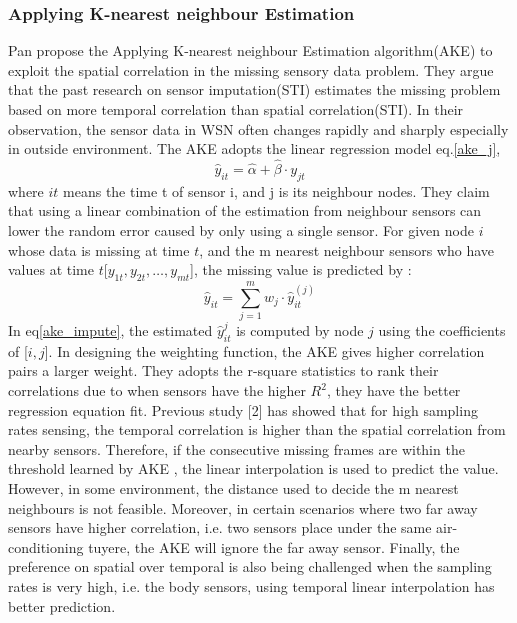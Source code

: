  \subsubsection{Applying K-nearest neighbour Estimation}
Pan\cite{pan2010k} propose the Applying K-nearest neighbour Estimation algorithm(AKE) to exploit the spatial correlation in the missing sensory data problem. They argue that the past research on sensor imputation(STI) estimates the missing problem based on more temporal correlation than spatial correlation(STI). In their observation, the sensor data in WSN often changes rapidly and sharply especially in outside environment. The AKE adopts the linear regression model eq.\ref{ake_j},
\begin{equation}
\hat{y}_{it} =\hat{\alpha} +\hat{\beta}\cdot y_{jt}
\label{ake_j}
\end{equation}
 where $it$ means the time t of sensor i,  and j is its neighbour nodes.  
They claim that using a linear combination of the estimation from neighbour sensors can lower the random error caused by only using a single sensor. 
For given node $i$ whose data is missing at time $t$, and the m nearest neighbour sensors who have values at time $t$[$y_{1t}, y_{2t},\dots, y_{mt}$], the missing value is predicted by :   
 \begin{equation}
 \hat{y}_{it} =\sum_{j=1}^m w_j \cdot \hat{y}_{it}^{(j)}
 \label{ake_impute}
 \end{equation}
%
In eq\ref{ake_impute}, the estimated $\hat{y}_{it}^{j}$ is computed by node $j$ using the coefficients of [$i,j$]. In designing the weighting function, the AKE gives higher correlation pairs a larger weight. They adopts the r-square statistics to rank their correlations due to when sensors have the higher $R^2$, they have the better regression equation fit. 
Previous study [2] has showed that for high sampling rates sensing, the temporal correlation is higher than the spatial correlation from nearby sensors. 
Therefore, if the consecutive missing frames are within the threshold learned by AKE , the linear interpolation is used to predict the value. 
However, in some environment, the distance used to decide the m nearest neighbours is not feasible. 
Moreover, in certain scenarios where two far away sensors have higher correlation, i.e. two sensors place under the same air-conditioning tuyere, the AKE will ignore the far away sensor.
Finally, the preference on spatial over temporal is also being challenged when the sampling rates is very high, i.e. the body sensors, using temporal linear interpolation has better prediction.   
